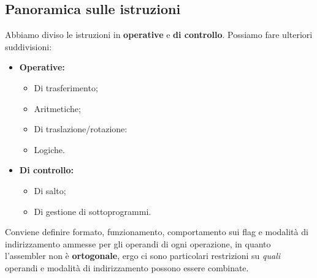 \documentclass[a4paper,11pt]{article}
\begin{document}
\subsection{Panoramica sulle istruzioni}
Abbiamo diviso le istruzioni in \textbf{operative} e \textbf{di controllo}.
Possiamo fare ulteriori suddivisioni:

\begin{itemize}
	\item \textbf{Operative:}
		\begin{itemize}
			\item Di trasferimento;
			\item Aritmetiche;
			\item Di traslazione/rotazione:
			\item Logiche.
		\end{itemize}
	\item \textbf{Di controllo:}
		\begin{itemize}
			\item Di salto;
			\item Di gestione di sottoprogrammi.
		\end{itemize}
\end{itemize}

Conviene definire formato, funzionamento, comportamento sui flag e modalità di indirizzamento ammesse per gli operandi di ogni operazione, in quanto l'assembler non è \textbf{ortogonale}, ergo ci sono particolari restrizioni su \textit{quali} operandi e modalità di indirizzamento possono essere combinate.
\end{document}
